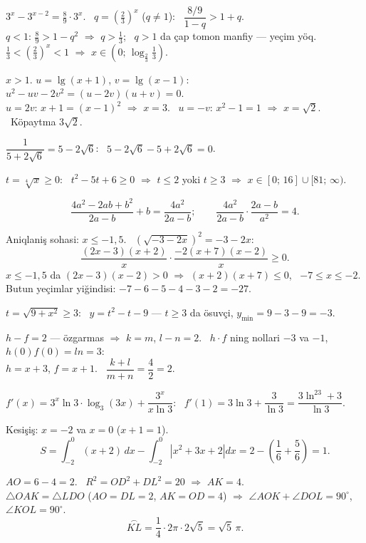 $3^x-3^{x-2}=\frac89\cdot3^x$. \ $q=\left(\frac23\right)^x$ ($q\ne1$): \ $\dfrac{8/9}{1-q}>1+q$.\\
$q<1$: $\frac89>1-q^2$ $\Rightarrow$ $q>\frac13$; \ $q>1$ da çap tomon manfiy — yeçim yöq.\\
$\frac13<\left(\frac23\right)^x<1$ $\Rightarrow$ $x\in\left(0;\,\log_{\frac23}\frac13\right)$.

$x>1$. $u=\lg(x+1)$, $v=\lg(x-1)$: \ $u^2-uv-2v^2=(u-2v)(u+v)=0$.\\
$u=2v$: $x+1=(x-1)^2$ $\Rightarrow$ $x=3$. \ $u=-v$: $x^2-1=1$ $\Rightarrow$ $x=\sqrt2$. \ Köpaytma $3\sqrt2$.

$\dfrac1{5+2\sqrt6}=5-2\sqrt6$: \ $5-2\sqrt6-5+2\sqrt6=0$.

$t=\sqrt[4]x\ge0$: \ $t^2-5t+6\ge0$ $\Rightarrow$ $t\le2$ yoki $t\ge3$ $\Rightarrow$ $x\in[0;\,16]\cup[81;\,\infty)$.

\[\frac{4a^2-2ab+b^2}{2a-b}+b=\frac{4a^2}{2a-b};\qquad \frac{4a^2}{2a-b}\cdot\frac{2a-b}{a^2}=4.\]

Aniqlaniş sohasi: $x\le-1{,}5$. \ $\left(\sqrt{-3-2x}\right)^2=-3-2x$:
\[\frac{(2x-3)(x+2)}x\cdot\frac{-2(x+7)(x-2)}x\ge0.\]
$x\le-1{,}5$ da $(2x-3)(x-2)>0$ $\Rightarrow$ $(x+2)(x+7)\le0$, \ $-7\le x\le-2$.\\
Butun yeçimlar yiğindisi: $-7-6-5-4-3-2=-27$.

$t=\sqrt{9+x^2}\ge3$: \ $y=t^2-t-9$ — $t\ge3$ da ösuvçi, $y_{\min}=9-3-9=-3$.

$h-f=2$ — özgarmas $\Rightarrow$ $k=m$, $l-n=2$. \ $h\cdot f$ ning nollari $-3$ va $-1$, $h(0)f(0)=ln=3$:\\
$h=x+3$, $f=x+1$. \ $\dfrac{k+l}{m+n}=\dfrac42=2$.

$f'(x)=3^x\ln3\cdot\log_3(3x)+\dfrac{3^x}{x\ln3}$: \ $f'(1)=3\ln3+\dfrac3{\ln3}=\dfrac{3\ln^23+3}{\ln3}$.

Kesişiş: $x=-2$ va $x=0$ ($x+1=1$).
\[S=\int_{-2}^0(x+2)\,dx-\int_{-2}^0\left|x^2+3x+2\right|dx=2-\left(\frac16+\frac56\right)=1.\]

$AO=6-4=2$. \ $R^2=OD^2+DL^2=20$ $\Rightarrow$ $AK=4$.\\
$\triangle OAK=\triangle LDO$ ($AO=DL=2$, $AK=OD=4$) $\Rightarrow$ $\angle AOK+\angle DOL=90^\circ$, \ $\angle KOL=90^\circ$.
\[\overset{\frown}{KL}=\frac14\cdot2\pi\cdot2\sqrt5=\sqrt5\,\pi.\]

